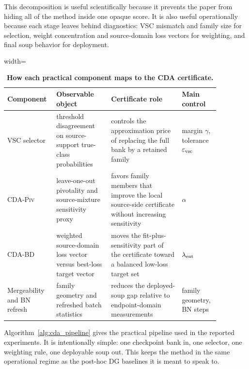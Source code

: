 \documentclass{article}
\theoremstyle{definition}
\newcommand{\eps}{\varepsilon}
\newcommand{\piv}{\textup{\textsc{CDA-Piv}}}
\newcommand{\bd}{\textup{\textsc{CDA-BD}}}
\begin{document}
This decomposition is useful scientifically because it prevents the paper from hiding all of the method inside one opaque score. It is also useful operationally because each stage leaves behind diagnostics: VSC mismatch and family size for selection, weight concentration and source-domain loss vectors for weighting, and final soup behavior for deployment.

\begin{table}[t]
\centering
\caption{\textbf{How each practical component maps to the CDA certificate.}}
\label{tab:component_map}
\begin{adjustbox}{width=\linewidth}
\begin{tabular}{>{\raggedright\arraybackslash}p{0.17\linewidth}>{\raggedright\arraybackslash}p{0.24\linewidth}>{\raggedright\arraybackslash}p{0.31\linewidth}>{\raggedright\arraybackslash}p{0.15\linewidth}}
\toprule
Component & Observable object & Certificate role & Main control \\
\midrule
VSC selector & threshold disagreement on source-support true-class probabilities & controls the approximation price of replacing the full bank by a retained family & margin \(\gamma\), tolerance \(\eps_{\rm vsc}\) \\
\piv{} & leave-one-out pivotality and source-mixture sensitivity proxy & favors family members that improve the local source-side certificate without increasing sensitivity & \(\alpha\) \\
\bd{} & weighted source-domain loss vector versus best-loss target vector & moves the fit-plus-sensitivity part of the certificate toward a balanced low-loss target set & \(\lambda_{\rm ent}\) \\
Mergeability and BN refresh & family geometry and refreshed batch statistics & reduces the deployed-soup gap relative to endpoint-domain measurements & family geometry, BN steps \\
\bottomrule
\end{tabular}
\end{adjustbox}
\end{table}

Algorithm~\ref{alg:cda_pipeline} gives the practical pipeline used in the reported experiments. It is intentionally simple: one checkpoint bank in, one selector, one weighting rule, one deployable soup out. This keeps the method in the same operational regime as the post-hoc DG baselines it is meant to speak to.
\end{document}

